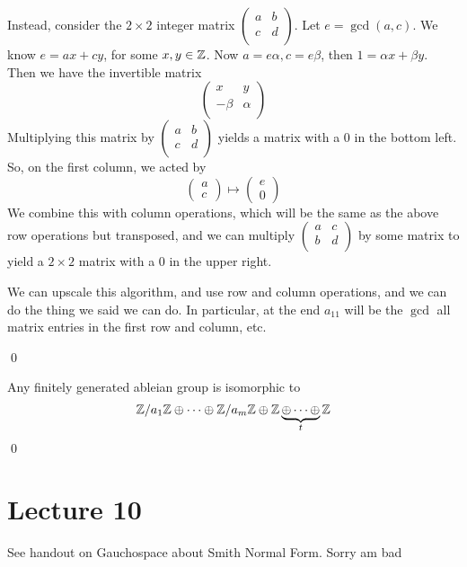 \documentclass[x11names,reqno,14pt]{extarticle}
\begin{document}
Instead, consider the $2\times2$ integer matrix $\begin{pmatrix} a & b \\ c & d \\ \end{pmatrix}$. Let $e = \gcd(a, c)$. We know $e = ax + cy$, for some $x, y \in \mathbb{Z}$. Now $a = e\alpha, c = e\beta$, then $1 = \alpha x + \beta y$. Then we have the invertible matrix
\[
\begin{pmatrix} x & y \\ - \beta & \alpha \\ \end{pmatrix} 
\]
Multiplying this matrix by $\begin{pmatrix} a & b \\ c & d \\ \end{pmatrix}$ yields a matrix with a $0$ in the bottom left. So, on the first column, we acted by 
\[
\begin{pmatrix} a \\ c \end{pmatrix} \mapsto \begin{pmatrix} e \\ 0 \end{pmatrix} 
\]
We combine this with column operations, which will be the same as the above row operations but transposed, and we can multiply $\begin{pmatrix} a & c \\ b & d \\ \end{pmatrix}$ by some matrix to yield a $2\times2$ matrix with a 0 in the upper right. 

We can upscale this algorithm, and use row and column operations, and we can do the thing we said we can do. In particular, at the end $a_{11}$ will be the $\gcd$ all matrix entries in the first row and column, etc. 

\qed

\cor

Any finitely generated ableian group is isomorphic to 
\[
\mathbb{Z}/a_1\mathbb{Z} \oplus \cdots \oplus \mathbb{Z}/a_m\mathbb{Z} \oplus \mathbb{Z} \underbrace{\oplus \cdots \oplus}_{t}\mathbb{Z}
\]
\qed

\section*{Lecture 10}

See handout on Gauchospace about Smith Normal Form. Sorry am bad
\end{document}
